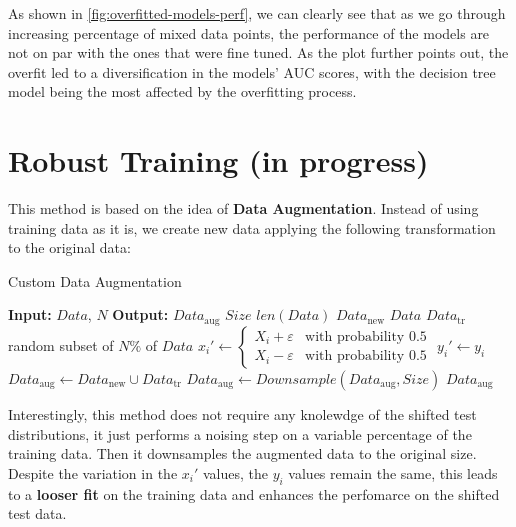 As shown in \cref{fig:overfitted-models-perf}, we can clearly see that as we go through increasing percentage of mixed data points, the performance of the models are not on par with the ones that were fine tuned. As the plot further points out, the overfit led to a diversification in the models' AUC scores, with the decision tree model being the most affected by the overfitting process. 

\section{Robust Training (in progress)}

This method is based on the idea of \textbf{Data Augmentation}. Instead of using training data as it is, we create new data applying the following transformation to the original data:

\begin{algorithm}[H]
    \caption{Custom Data Augmentation}
    \begin{algorithmic}[1]
        \Statex \textbf{Input:} $Data$, $N$
        \Statex \textbf{Output:} $Data_\text{aug}$
        \Statex
        \State $Size$ \leftarrow $len(Data)$ 
        \State $Data_\text{new}$ \leftarrow $Data$
        \State $Data_\text{tr}$ \leftarrow random subset of $N\%$ of $Data$
            \State $x_i' \leftarrow 
            \begin{cases}
                X_i + \varepsilon & \text{with probability } 0.5 \\
                X_i - \varepsilon & \text{with probability } 0.5
            \end{cases}$
            \State $y_i' \leftarrow y_i$
        \EndFor
        \State $Data_\text{aug} \leftarrow Data_\text{new} \cup Data_\text{tr}$
        \State $Data_\text{aug} \leftarrow Downsample(Data_\text{aug}, Size)$
        \State\Return $Data_\text{aug}$
    \end{algorithmic}
\end{algorithm}

Interestingly, this method does not require any knolewdge of the shifted test distributions, it just performs a noising step on a variable percentage of the training data. Then it downsamples the augmented data to the original size.
Despite the variation in the $x_i'$ values, the $y_i$ values remain the same, this leads to a \textbf{looser fit} on the training data and enhances the perfomarce on the shifted test data.

